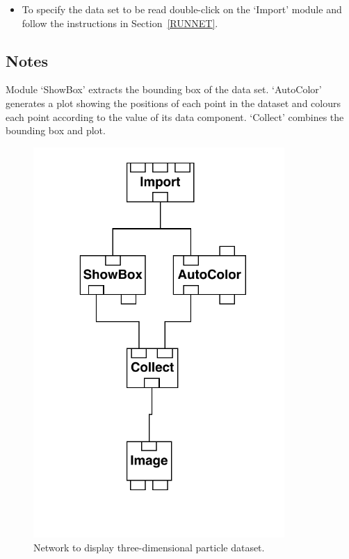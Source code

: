 \documentclass[twoside,11pt]{article}
\begin{document}
\begin{itemize}

  \item To specify the data set to be read double-click on the `Import'
   module and follow the instructions in Section~\ref{RUNNET}.

\end{itemize}

\subsection{Notes}

Module `ShowBox' extracts the bounding box of the data set. `AutoColor'
generates a plot showing the positions of each point in the dataset and
colours each point according to the value of its data component.
`Collect' combines the bounding box and plot.

\begin{figure}[htbp]

\begin{center}
\leavevmode
\includegraphics[width=271pt]{sc2_particle}
\end{center}

\caption[Network to display three-dimensional particle dataset.]{Network
to display three-dimensional particle dataset. \label{PARTNETF} }

\end{figure}
\end{document}
